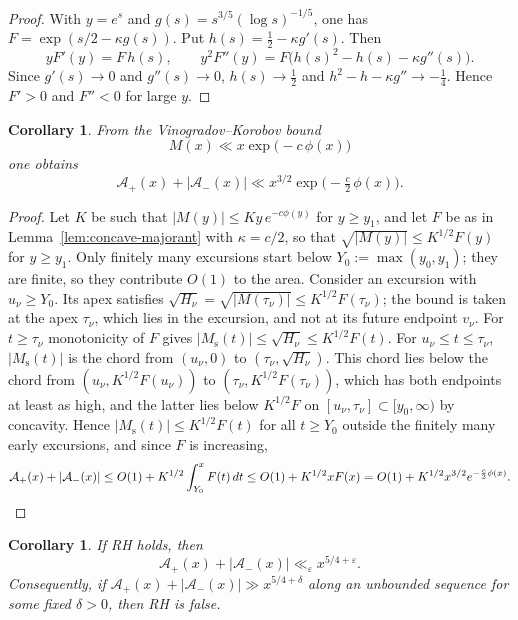 \documentclass[11pt]{amsart}
\numberwithin{equation}{section}
\theoremstyle{plain}
\newtheorem{corollary}[theorem]{Corollary}
\theoremstyle{definition}
\theoremstyle{remark}
\newcommand{\Ms}{M_{\mathrm{s}}}
\newcommand{\Ap}{\mathcal{A}_{+}}
\newcommand{\Am}{\mathcal{A}_{-}}
\newcommand{\eps}{\varepsilon}
\begin{document}
\begin{proof}
With $y=e^s$ and $g(s)=s^{3/5}(\log s)^{-1/5}$, one has
$F=\exp(s/2-\kappa g(s))$. Put $h(s)=\frac12-\kappa g'(s)$. Then
\[
yF'(y)=F\,h(s),\qquad
y^2F''(y)=F\bigl(h(s)^2-h(s)-\kappa g''(s)\bigr).
\]
Since $g'(s)\to0$ and $g''(s)\to0$, $h(s)\to\frac12$ and
$h^2-h-\kappa g''\to-\frac14$. Hence $F'>0$ and $F''<0$ for large $y$.
\end{proof}

\begin{corollary}
\label{cor:uncond}
From the Vinogradov--Korobov bound \cite{Walfisz1963}
\begin{equation}
\label{eq:VK_M}
  M(x)\ll x\exp\bigl(-c\,\phi(x)\bigr)
\end{equation}
one obtains
\begin{equation}
\label{eq:uncond_area}
  \Ap(x)+|\Am(x)|\ll x^{3/2}\exp\bigl(-\tfrac c2\,\phi(x)\bigr).
\end{equation}
\end{corollary}

\begin{proof}
Let $K$ be such that $|M(y)|\le Ky\,e^{-c\phi(y)}$ for $y\ge y_1$, and let
$F$ be as in Lemma~\ref{lem:concave-majorant} with $\kappa=c/2$, so that
$\sqrt{|M(y)|}\le K^{1/2}F(y)$ for $y\ge y_1$. Only finitely many excursions
start below $Y_0:=\max(y_0,y_1)$; they are finite, so they contribute
$O(1)$ to the area. Consider an excursion with $u_\nu\ge Y_0$. Its apex
satisfies $\sqrt{H_\nu}=\sqrt{|M(\tau_\nu)|}\le K^{1/2}F(\tau_\nu)$; the
bound is taken at the apex $\tau_\nu$, which lies in the excursion, and not
at its future endpoint $v_\nu$. For $t\ge\tau_\nu$ monotonicity of $F$ gives
$|\Ms(t)|\le\sqrt{H_\nu}\le K^{1/2}F(t)$. For $u_\nu\le t\le\tau_\nu$,
$|\Ms(t)|$ is the chord from $(u_\nu,0)$ to $(\tau_\nu,\sqrt{H_\nu})$. This
chord lies below the chord from $(u_\nu,K^{1/2}F(u_\nu))$ to
$(\tau_\nu,K^{1/2}F(\tau_\nu))$, which has both endpoints at least as high,
and the latter lies below $K^{1/2}F$ on $[u_\nu,\tau_\nu]\subset[y_0,\infty)$
by concavity. Hence $|\Ms(t)|\le K^{1/2}F(t)$ for all $t\ge Y_0$ outside the
finitely many early excursions, and since $F$ is increasing,
\[
\Ap(x)+|\Am(x)|\le O(1)+K^{1/2}\int_{Y_0}^xF(t)\,dt
\le O(1)+K^{1/2}xF(x)=O(1)+K^{1/2}x^{3/2}e^{-\frac c2\phi(x)}.
\qedhere
\]
\end{proof}

\begin{corollary}
\label{cor:rh}
If RH holds, then
\begin{equation}
\label{eq:rh_area}
  \Ap(x)+|\Am(x)|\ll_\eps x^{5/4+\eps}.
\end{equation}
Consequently, if $\Ap(x)+|\Am(x)|\gg x^{5/4+\delta}$ along an unbounded
sequence for some fixed $\delta>0$, then RH is false.
\end{corollary}
\end{document}
